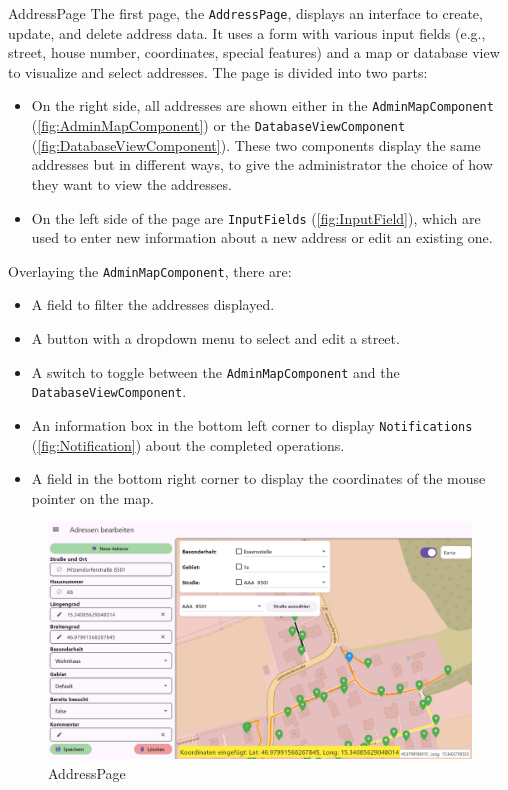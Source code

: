 \newpage

\begin{subsection}{AddressPage}
    \sloppy
    The first page, the \texttt{AddressPage}, displays an interface to create, update, and delete address data. It uses a form with various input fields (e.g., street, house number, coordinates, special features) and a map or database view to visualize and select addresses. The page is divided into two parts:

    \begin{itemize}
        \item On the right side, all addresses are shown either in the \texttt{AdminMapComponent} (\ref{fig:AdminMapComponent}) or the \texttt{DatabaseViewComponent} (\ref{fig:DatabaseViewComponent}). These two components display the same addresses but in different ways, to give the administrator the choice of how they want to view the addresses.
        \item On the left side of the page are \texttt{InputFields} (\ref{fig:InputField}), which are used to enter new information about a new address or edit an existing one.
    \end{itemize}

    Overlaying the \texttt{AdminMapComponent}, there are:

    \begin{itemize}
        \item A field to filter the addresses displayed.
        \item A button with a dropdown menu to select and edit a street.
        \item A switch to toggle between the \texttt{AdminMapComponent} and the \texttt{DatabaseViewComponent}.
        \item An information box in the bottom left corner to display \texttt{Notifications} (\ref{fig:Notification}) about the completed operations.
        \item A field in the bottom right corner to display the coordinates of the mouse pointer on the map.
    \end{itemize}
    

    \begin{figure}[H]
        \centering
        \includegraphics[width=1\linewidth]{images/AdminPanel/AddressPage.png}
        \caption{AddressPage}
    \end{figure}
\end{subsection}
\newpage


